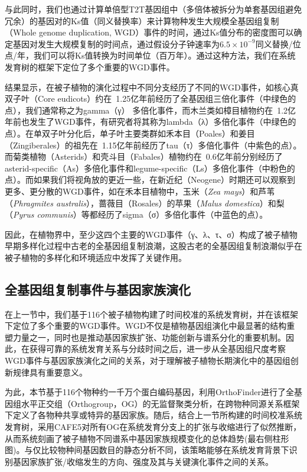 与此同时，我们也通过计算单倍型T2T基因组中（多倍体被拆分为单套基因组避免冗余）的基因对的Ks值（同义替换率）来计算物种发生大规模全基因组复制（Whole genome duplication, WGD）事件的时间，通过Ks值分布的密度图可以确定基因对发生大规模复制的时间点，通过假设分子钟速率为$6.5\times10^{-9}$同义替换/位点/年\cite{wolfe1989rates}，我们可以将Ks值转换为时间单位（百万年）。通过这种方法，我们在系统发育树的框架下定位了多个重要的WGD事件。

结果显示，在被子植物的演化过程中不同分支经历了不同的WGD事件，如核心真双子叶（Core eudicots）约在~1.25亿年前经历了全基因组三倍化事件（中绿色的点），我们通常称之为gamma（γ） 多倍化事件\cite{jiao2012genome}，而木兰类如樟目植物约在~1.2亿年前也发生了WGD事件\cite{chen2020litsea}，有研究者将其称为lambda（λ）多倍化事件（中绿色的点）\cite{zhang2020ancient}。在单双子叶分化后，单子叶主要类群如禾本目（Poales）和姜目（Zingiberales）的祖先在~1.15亿年前经历了tau（τ）多倍化事件（中紫色的点）\cite{jiao2014integrated}。而菊类植物（Asterids）和壳斗目（Fabales）植物约在~0.6亿年前分别经历了asterid-specific（As）多倍化事件和legume-specific（Ls）多倍化事件（中粉色的点）。而如果我们将视角放的更近一些，在新近纪（Neogene）时期还可以观察到更多、更分散的WGD事件，如在禾本目植物中，玉米（\textit{Zea mays}）和芦苇（\textit{Phragmites australis}），蔷薇目（Rosales）的苹果（\textit{Malus domestica}）和梨（\textit{Pyrus communis}）等都经历了sigma（σ）多倍化事件（中蓝色的点）\cite{wu2020genetic}。

因此，在植物界中，至少这四个主要的WGD事件（γ、λ、τ、σ）构成了被子植物早期多样化过程中古老的全基因组复制浪潮，这股古老的全基因组复制浪潮似乎在被子植物的多样化和环境适应中发挥了关键作用\cite{zhang2020water}。

\subsection{全基因组复制事件与基因家族演化}

在上一节中，我们基于116个被子植物构建了时间校准的系统发育树，并在该框架下定位了多个重要的WGD事件。WGD不仅是植物基因组演化中最显著的结构重塑力量之一，同时也是推动基因家族扩张、功能创新与谱系分化的重要机制\cite{wu2020genetic}。因此，在获得可靠的系统发育关系与分歧时间之后，进一步从全基因组尺度考察WGD事件与基因家族演化之间的关系，对于理解被子植物长期演化中的基因组创新规律具有重要意义。

为此，本节基于116个物种约一千万个蛋白编码基因，利用OrthoFinder进行了全基因组水平正交组（Orthogroup，OG）的无监督聚类分析\cite{emms2019orthofinder}，在跨物种同源关系框架下定义了各物种共享或特异的基因家族。随后，结合上一节所构建的时间校准系统发育树，采用CAFE5对所有OG在系统发育分支上的扩张与收缩进行了似然推断\cite{mendes2020cafe}，从而系统刻画了被子植物不同谱系中基因家族规模变化的总体趋势(最右侧柱形图)。与仅比较物种间基因数目的静态分析不同，该策略能够在系统发育背景下识别基因家族扩张/收缩发生的方向、强度及其与关键演化事件之间的关系。

